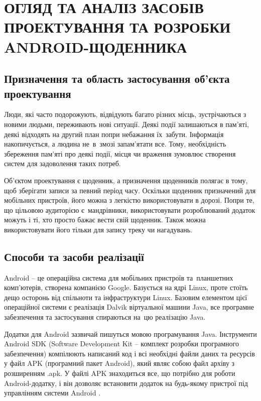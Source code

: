 \documentclass[../main.tex]{subfiles}
\begin{document}
\chapter{ОГЛЯД ТА АНАЛІЗ ЗАСОБІВ ПРОЕКТУВАННЯ ТА РОЗРОБКИ ANDROID-ЩОДЕННИКА}

\section{Призначення та область застосування об'єкта проектування}

Люди, які часто подорожують, відвідують багато різних місць, зустрічаються з новими людьми, переживають нові ситуації. Деякі події залишаються в пам'яті, деякі відходять на другий план попри небажання їх~забути. Інформація накопичується, а людина не~в~змозі запам'ятати все. Тому, необхідність збереження пам'яті про деякі події, місця чи враження зумовлює створення систем для задоволення таких потреб.

Об'єктом проектування є щоденник, а призначення щоденників полягає в тому, щоб зберігати записи за певний період часу. Оскільки щоденник призначений для мобільних пристроїв, його можна з легкістю використовувати в дорозі. Попри те, що цільовою аудиторією є~мандрівники, використовувати розроблюваний додаток можуть і ті, хто просто бажає вести свій щоденник. Також можна використовувати його тільки для запису треку чи нагадувань.

\section{Способи та засоби реалізації}

Android -- це операційна система для мобільних пристроїв та~планшетних комп'ютерів, створена компанією Google. Базується на ядрі Linux, проте стоїть дещо осторонь від спільноти та інфраструктури Linux. Базовим елементом цієї операційної системи є реалізація Dalvik віртуальної машини Java, все програмне забезпечення та застосування спираються на~цю реалізацію Java.

Додатки для Android зазвичай пишуться мовою програмування Java. Інструменти Android SDK (Software Development Kit -- комплект розробки програмного забезпечення) компілюють написаний код і всі необхідні файли даних та ресурсів у файл APK (програмний пакет Android), який являє собою файл архіву з розширенням .apk. У файлі APK знаходиться все, що потрібно для роботи Android-додатку, і він дозволяє встановити додаток на будь-якому пристрої під управлінням системи Android \cite{android_for_devs}. 
\end{document}
